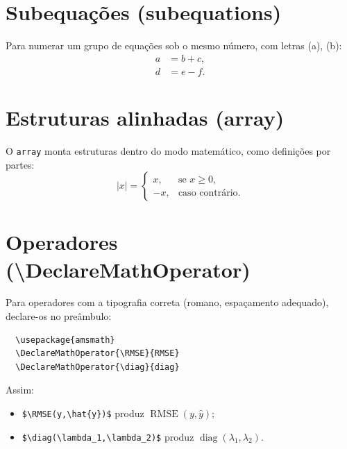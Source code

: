 \documentclass[dsc,pdfa]{coppe}
\DeclareMathOperator{\RMSE}{RMSE}   %
\DeclareMathOperator{\diag}{diag}
\begin{document}
  \section{Subequações (subequations)}
  Para numerar um grupo de equações sob o mesmo número, com letras (a), (b):
  \begin{subequations}
  \begin{align}
    a &= b + c , \\
    d &= e - f .
  \end{align}
  \end{subequations}

  \section{Estruturas alinhadas (array)}
  O \verb|array| monta estruturas dentro do modo matemático, como definições por partes:
  \begin{equation}
    |x| = \left\{ \begin{array}{ll}
      x,  & \text{se } x \ge 0 , \\
      -x, & \text{caso contrário.}
    \end{array} \right.
  \end{equation}

  \section{Operadores (\textbackslash DeclareMathOperator)}
  Para operadores com a tipografia correta (romano, espaçamento adequado), declare-os no preâmbulo:
  \begin{verbatim}
  \usepackage{amsmath}
  \DeclareMathOperator{\RMSE}{RMSE}
  \DeclareMathOperator{\diag}{diag}
  \end{verbatim}
  Assim:
  \begin{itemize}
    \item \verb|$\RMSE(y,\hat{y})$| produz $\RMSE(y,\hat{y})$;
    \item \verb|$\diag(\lambda_1,\lambda_2)$| produz
          $\diag(\lambda_1,\lambda_2)$.
  \end{itemize}
\end{document}
